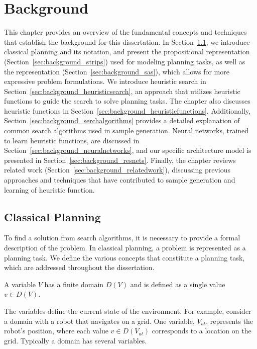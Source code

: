 \chapter{Background}
\label{sec:preliminaries}

This chapter provides an overview of the fundamental concepts and techniques that establish the background for this dissertation. In Section~\ref{sec:background_classicalplanning}, we introduce classical planning and its notation, and present the propositional representation (Section~\ref{sec:background_strips}) used for modeling planning tasks, as well as the \sas representation (Section~\ref{sec:background_sas}), which allows for more expressive problem formulations. We introduce heuristic search in Section~\ref{sec:background_heuristicsearch}, an approach that utilizes heuristic functions to guide the search to solve planning tasks. The chapter also discusses heuristic functions in Section~\ref{sec:background_heuristicfunctions}. Additionally, Section~\ref{sec:background_serchalgorithms} provides a detailed explanation of common search algorithms used in sample generation. Neural networks, trained to learn heuristic functions, are discussed in Section~\ref{sec:background_neuralnetworks}, and our specific architecture model is presented in Section~\ref{sec:background_resnets}. Finally, the chapter reviews related work (Section~\ref{sec:background_relatedwork}), discussing previous approaches and techniques that have contributed to sample generation and learning of heuristic function.

\section{Classical Planning}
\label{sec:background_classicalplanning}

To find a solution from search algorithms, it is necessary to provide a formal description of the problem. In classical planning, a problem is represented as a planning task. We define the various concepts that constitute a planning task, which are addressed throughout the dissertation.

\begin{definition}[Variable]\label{def:variable}
    A variable $V$ has a finite domain $D(V)$ and is defined as a single value $v \in D(V)$.
\end{definition}

The variables define the current state of the environment. For example, consider a domain with a robot that navigates on a grid. One variable, $V_{at}$, represents the robot's position, where each value $v \in D(V_{at})$ corresponds to a location on the grid. Typically a domain has several variables.

